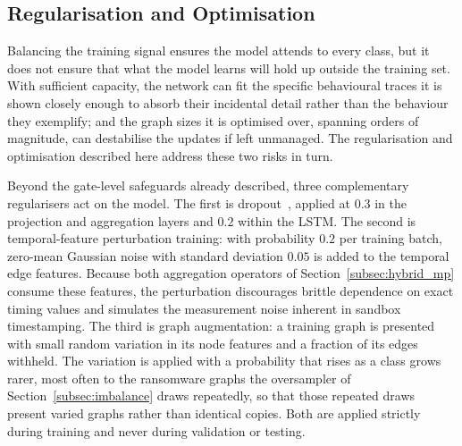 \documentclass[%
    BCOR=10mm,
    DIV=13,
    toc=bibliography,
    toc=listof,
    oneside,
    12pt,
]{scrbook}
\begin{document}
\subsection{Regularisation and Optimisation}
\label{subsec:regularisation}
\label{subsec:optimisation}

Balancing the training signal ensures the model attends to every class, but it
does not ensure that what the model learns will hold up outside the training set.
With sufficient capacity, the network can fit the specific behavioural traces it
is shown closely enough to absorb their incidental detail rather than the
behaviour they exemplify; and the graph sizes it is optimised over, spanning
orders of magnitude, can destabilise the updates if left unmanaged. The
regularisation and optimisation described here address these two risks in turn.

Beyond the gate-level safeguards already described, three complementary
regularisers act on the model. The first is
dropout~\cite{srivastava2014dropout}, applied at $0.3$ in the projection and
aggregation layers and $0.2$ within the LSTM. The second is temporal-feature
perturbation training: with probability $0.2$ per training batch, zero-mean
Gaussian noise with standard deviation $0.05$ is added to the temporal
edge features. Because both aggregation operators of
Section~\ref{subsec:hybrid_mp} consume these features, the perturbation
discourages brittle dependence on exact timing values and simulates the
measurement noise inherent in sandbox timestamping. The third is graph
augmentation: a training graph is presented with small random variation in its
node features and a fraction of its edges withheld. The variation is applied
with a probability that rises as a class grows rarer, most often to the
ransomware graphs the oversampler of Section~\ref{subsec:imbalance} draws
repeatedly, so that those repeated draws present varied graphs rather than
identical copies. Both are applied strictly
during training and never during validation or testing.
\end{document}
